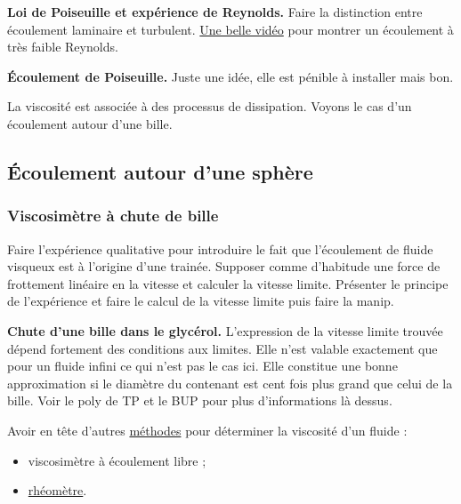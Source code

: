 \begin{slide}
\textbf{Loi de Poiseuille et expérience de Reynolds.}
Faire la distinction entre écoulement laminaire et turbulent.
\href{https://www.youtube.com/watch?v=k7ZZtxdtmeQ}{Une belle vidéo} pour montrer un écoulement à très faible Reynolds.
\end{slide}

\begin{experience}
\textbf{Écoulement de Poiseuille.}
Juste une idée, elle est pénible à installer mais bon.
\end{experience}

\begin{transition}
La viscosité est associée à des processus de dissipation.
Voyons le cas d'un écoulement autour d'une bille.
\end{transition}

\subsection{Écoulement autour d'une sphère}

\subsubsection{Viscosimètre à chute de bille}

Faire l'expérience qualitative pour introduire le fait que l'écoulement de fluide visqueux est à l'origine d'une trainée.
Supposer \og comme d'habitude \fg{} une force de frottement linéaire en la vitesse et calculer la vitesse limite.
Présenter le principe de l'expérience et faire le calcul de la vitesse limite puis faire la manip.

\begin{experience}
\textbf{Chute d'une bille dans le glycérol.}
L'expression de la vitesse limite trouvée dépend fortement des conditions aux limites.
Elle n'est valable exactement que pour un fluide infini ce qui n'est pas le cas ici.
Elle constitue une bonne approximation si le diamètre du contenant est cent fois plus grand que celui de la bille.
Voir le poly de TP et le BUP pour plus d'informations là dessus.
\end{experience}

\begin{remarque}
Avoir en tête d'autres \href{https://fr.wikipedia.org/wiki/Viscosim\%C3\%A8tre}{méthodes} pour déterminer la viscosité d'un fluide :
\begin{itemize}
\item viscosimètre à écoulement libre ;
\item \href{https://fr.wikipedia.org/wiki/Rh\%C3\%A9om\%C3\%A8tre}{rhéomètre}.
\end{itemize}
\end{remarque}

